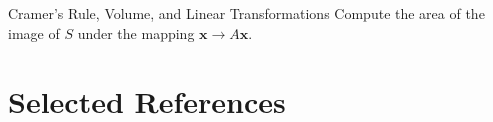 \documentclass[10pt, aspectratio=169]{beamer}
\begin{document}
\begin{frame}{Cramer's Rule, Volume, and Linear Transformations}
{Compute the area of the image of \(S\) under the mapping \(\mathbf{x} \rightarrow A\mathbf{x}\).
}
\end{frame}






\section*{Selected References}
\begin{frame}[allowframebreaks]
\printbibliography
\end{frame}
\end{document}
